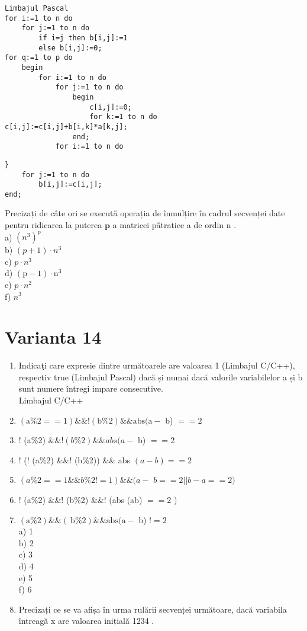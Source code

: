 \begin{verbatim}
Limbajul Pascal
for i:=1 to n do
    for j:=1 to n do
        if i=j then b[i,j]:=1
        else b[i,j]:=0;
for q:=1 to p do
    begin
        for i:=1 to n do
            for j:=1 to n do
                begin
                    c[i,j]:=0;
                    for k:=1 to n do
c[i,j]:=c[i,j]+b[i,k]*a[k,j];
                end;
            for i:=1 to n do
\end{verbatim}

\begin{verbatim}
}
    for j:=1 to n do
        b[i,j]:=c[i,j];
end;
\end{verbatim}

Precizați de câte ori se execută operația de înmulțire în cadrul secvenței date pentru ridicarea la puterea $\mathbf{p}$ a matricei pătratice a de ordin n .\\
a) $\left(n^{3}\right)^{p}$\\
b) $(p+1) \cdot n^{3}$\\
c) $p \cdot n^{3}$\\
d) $(\mathrm{p}-1) \cdot \mathrm{n}^{3}$\\
e) $p \cdot n^{2}$\\
f) $n^{3}$

\section*{Varianta 14}
\begin{enumerate}
  \item Indicaţi care expresie dintre următoarele are valoarea 1 (Limbajul C/C++), respectiv true (Limbajul Pascal) dacă și numai dacă valorile variabilelor a și b sunt numere întregi impare consecutive.\\
Limbajul C/C++
  \item $(\mathrm{a} \% 2==1) \& \&!(\mathrm{b} \% 2) \& \& \mathrm{abs}(\mathrm{a}-$ b) $==2$
  \item ! (a\%2) $\& \&!(b \% 2) \& \& a b s(a-$ b) $==2$
  \item ! (! (a\%2) \&\&! (b\%2)) \&\& abs $(a-b)==2$
  \item $(a \% 2==1 \& \& b \% 2!=1) \& \&(a-$ $b==2| | b-a==2)$
  \item ! (a\%2) \&\&! (b\%2) \&\&! (abs (ab) $==2$ )
  \item $(\mathrm{a} \% 2) \& \&(\mathrm{~b} \% 2) \& \& \mathrm{abs}(\mathrm{a}-$ b) $!=2$\\
a) 1\\
b) 2\\
c) 3\\
d) 4\\
e) 5\\
f) 6
  \item Precizați ce se va afișa în urma rulării secvenței următoare, dacă variabila întreagă x are valoarea inițială 1234 .
\end{enumerate}

